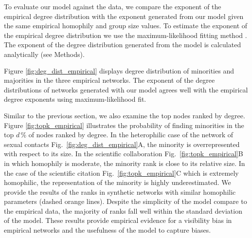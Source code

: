 
To evaluate our model against the data, we compare the exponent of the empirical degree distribution with the exponent generated from our model given the same empirical homophily and group size values. To estimate the exponent of the empirical degree distribution we use the maximum-likelihood fitting method \cite{clauset2009power,alstott2014powerlaw}. The exponent of the degree distribution generated from the model is calculated analytically (see Methods).


Figure \ref{fig:deg_dist_empirical} displays degree distribution of minorities and majorities in the three empirical networks. The exponent of the degree distributions of networks generated with our model agrees well with the empirical degree exponents using maximum-likelihood fit.

Similar to the previous section, we also examine the top nodes ranked by degree. Figure \ref{fig:topk_empirical} illustrates the probability of finding minorities in the top $d$\,\% of nodes ranked by degree. In the heterophilic case of the network of sexual contacts Fig.~\ref{fig:deg_dist_empirical}A, the minority is overrepresented with respect to its size.  In the
scientific collaboration Fig.~\ref{fig:topk_empirical}B in which homophily is moderate, the minority rank is close to its relative size. In the case of the scientific citation Fig.~\ref{fig:topk_empirical}C which is extremely homophilic, the representation of the minority is highly underestimated. We provide the results of the ranks in synthetic networks with similar homophilic parameters (dashed orange lines). Despite the simplicity of the model compare to the empirical data, the majority of ranks fall well within the standard deviation of the model. These results provide empirical evidence for a visibility bias in empirical networks and the usefulness of the model to capture biases. 

